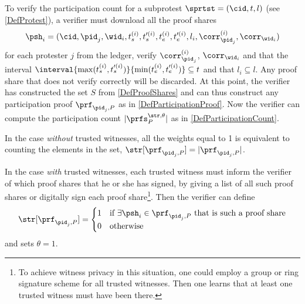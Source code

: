 To verify the participation count for a subprotest \(\sprtst = (\cid, t, l)\) 
(see \cref{DefProtest}), a verifier must download all the proof shares \[
  \psh_i =   (\cid, \pid_j, \wid_i, t_s^{(i)}, t_s^{\prime (i)}, t_e^{(i)}, 
  t_e^{\prime   (i)}, l_i, \corr_{\pid_j}^{(i)}, \corr_{\wid_i})
\] for each protester \(j\) from the ledger, verify \(\corr_{\pid_j}^{(i)}\), 
\(\corr_{\wid_i}\) and that the interval \(\interval{\max(t_s^{(i)}, 
    t_s^{\prime (i)})}{\min(t_e^{(i)}, t_e^{\prime (i)})}\subseteq t\) and that 
\(l_i\subseteq  l\).
Any proof share that does not verify correctly will be discarded.
At this point, the verifier has constructed the set \(S\) from 
\cref{DefProofShares} and can thus construct any participation proof 
\(\prf_{\pid_j, P}\) as in \cref{DefParticipationProof}.
Now the verifier can compute the participation count \(|\prfs_P^{\str, 
    \theta}|\) as in \cref{DefParticipationCount}.

In the case \emph{without} trusted witnesses, all the weights equal to 1 is equivalent to counting the elements in the set, 
\(\str[\prf_{\pid_j, P}] = |\prf_{\pid_j, P}|\).

In the case \emph{with} trusted witnesses, each trusted witness must inform the 
verifier of which proof shares that he or she has signed, \eg by giving a list 
of all such proof shares or digitally sign each proof share\footnote{%
  To achieve witness privacy in this situation, one could employ a group or 
  ring signature scheme for all trusted witnesses.
  Then one learns that at least one trusted witness must have been there.
}.
Then the verifier can define \[
  \str[\prf_{\pid_j, P}] = \begin{cases}
    1 & \text{if \(\exists \psh_i\in \prf_{\pid_j, P}\) that is such a proof 
      share} \\
    0 & \text{otherwise}
  \end{cases}
\] and sets \(\theta = 1\).
